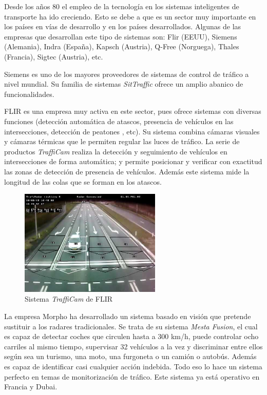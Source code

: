 Desde los años 80 el empleo de la tecnología en los sistemas inteligentes de transporte ha ido creciendo. Esto se debe a que es un sector muy importante en los países en vías de desarrollo y en los países desarrollados. Algunas de las empresas que desarrollan este tipo de sistemas son: Flir (EEUU), Siemens (Alemania), Indra (España), Kapsch (Austria), Q-Free (Norguega), Thales (Francia), Sigtec (Austria), etc.

Siemens es uno de los mayores proveedores de sistemas de control de tráfico a nivel mundial. Su familia de sistemas \textit{SitTraffic} ofrece un amplio abanico de funcionalidades.

FLIR es una empresa muy activa en este sector, pues ofrece sistemas con diversas funciones (detección automática de atascos, presencia de vehículos en las intersecciones, detección de peatones , etc).  Su sistema combina cámaras visuales y cámaras térmicas que le permiten regular las luces de tráfico. La serie de productos \textit{TraffiCam} realiza la detección y seguimiento de vehículos en intersecciones de forma automática; y permite posicionar y verificar con exactitud las zonas de detección de presencia de vehículos. Además este sistema mide la longitud de las colas que se forman en los atascos.

\begin{figure}[H]
  \begin{center}
    \includegraphics[width=0.6\textwidth]{figures/Introduccion/flir.jpg}
		\caption{Sistema \textit{TraffiCam} de FLIR}
		\label{fig.flir}
		\end{center}
\end{figure}

La empresa Morpho ha desarrollado un sistema basado en visión que pretende sustituir a los radares tradicionales. Se trata de su sistema \textit{Mesta Fusion}, el cual es capaz de detectar coches que circulen hasta a 300 km/h, puede controlar ocho carriles al mismo tiempo, supervisar 32 vehículos a la vez y discriminar entre ellos según sea un turismo, una moto, una furgoneta o un camión o autobús. Además es capaz de identificar casi cualquier acción indebida.  Todo eso lo hace un sistema perfecto en temas de monitorización de tráfico. Este sistema ya está operativo en Francia y Dubai.

